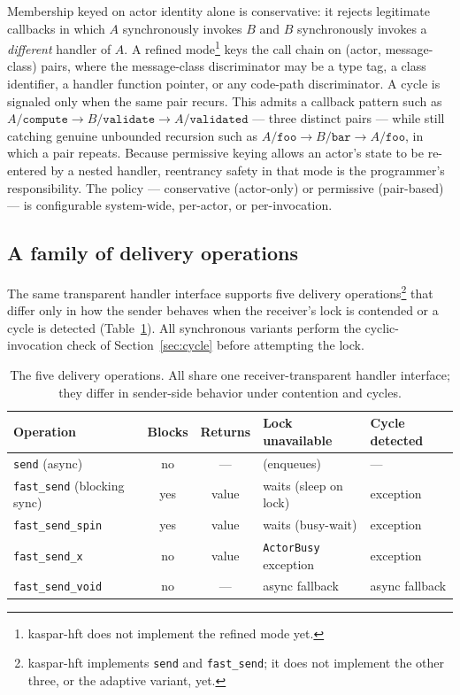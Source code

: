 \documentclass[11pt]{article}
\newcommand{\fs}{\texttt{fast\_send}}
\newcommand{\snd}{\texttt{send}}
\begin{document}
Membership keyed on actor identity alone is conservative: it rejects legitimate
callbacks in which $A$ synchronously invokes $B$ and $B$ synchronously invokes a
\emph{different} handler of $A$. A refined mode\footnote{kaspar-hft does not
implement the refined mode yet.} keys the call chain on
(actor, message-class) pairs, where the message-class discriminator may be a type
tag, a class identifier, a handler function pointer, or any code-path
discriminator. A cycle is signaled only when the same pair recurs. This admits a
callback pattern such as $A/\texttt{compute} \to B/\texttt{validate} \to
A/\texttt{validated}$ --- three distinct pairs --- while still catching genuine
unbounded recursion such as $A/\texttt{foo} \to B/\texttt{bar} \to
A/\texttt{foo}$, in which a pair repeats. Because permissive keying allows an
actor's state to be re-entered by a nested handler, reentrancy safety in that
mode is the programmer's responsibility. The policy --- conservative
(actor-only) or permissive (pair-based) --- is configurable system-wide,
per-actor, or per-invocation.

\subsection{A family of delivery operations}
\label{sec:family}

The same transparent handler interface supports five delivery
operations\footnote{kaspar-hft implements \snd{} and \fs{}; it does not
implement the other three, or the adaptive variant, yet.} that
differ only in how the sender behaves when the receiver's lock is contended or a
cycle is detected (Table~\ref{tab:five}). All synchronous variants perform the
cyclic-invocation check of Section~\ref{sec:cycle} before attempting the lock.

\begin{table}[h]
\centering
\caption{The five delivery operations. All share one receiver-transparent
handler interface; they differ in sender-side behavior under contention and
cycles.}
\label{tab:five}
\small
\begin{tabular}{lccll}
\toprule
Operation & Blocks & Returns & Lock unavailable & Cycle detected \\
\midrule
\snd{} (async)          & no  & ---   & (enqueues)            & --- \\
\fs{} (blocking sync)   & yes & value & waits (sleep on lock) & exception \\
\texttt{fast\_send\_spin} & yes & value & waits (busy-wait)     & exception \\
\texttt{fast\_send\_x}    & no  & value & \texttt{ActorBusy} exception & exception \\
\texttt{fast\_send\_void} & no  & ---   & async fallback        & async fallback \\
\bottomrule
\end{tabular}
\end{table}
\end{document}
